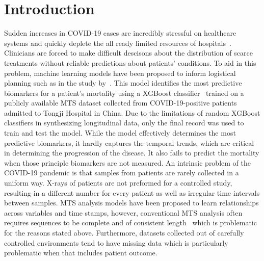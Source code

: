 \section{Introduction}
\iffalse 

1. Which problem we are going to solve?
2. Why solving this problem is important?
3. Which studies have beed tried to solve this problem and what are the disadvantages/difficulties of them?
    3-1. Which properties of longitudinal image datasets should be considered to solve the problem? (e.g. time series, inconsistent number of scans for different participants, some are labeled others are not labeled, ..)
4. So which model we are going to propose to solve the listed problems above?
    4-1. Learn enriched representation of longitudinal images data in a fixed-length vector format which can be readily integrated with the static data.
    4-2. Convolutional layer + LSTM to enrich the images.
    4-3. The proposed model is Semi-supervised learning model.~\cite{tuncel2018autoregressive}
\fi 

Sudden increases in COVID-19 cases are incredibly stressful on healthcare systems and quickly deplete the all ready limited resources of hospitals~\cite{centersstrategies}. Clinicians are forced to make difficult descisons about the distribution of scarce treatments without reliable predictions about patients' conditions. To aid in this problem, machine learning models have been proposed to inform logistical planning such as in the study by~\cite{yan2020interpretable}. This model \cite{yan2020interpretable} identifies the most predictive biomarkers for a patient's mortality using a XGBoost classifier~\cite{chen2016xgboost} trained on a publicly available MTS dataset collected from COVID-19-positive patients admitted to Tongji Hospital in China. Due to the limitations of random XGBoost classifiers in synthesizing longitudinal data, only the final record was used to train and test the model. While the model effectively determines the most predictive biomarkers, it hardly captures the temporal trends, which are critical in determining the progression of the disease. It also fails to predict the mortality when those principle biomarkers are not measured. An intrinsic problem of the COVID-19 pandemic is that samples from patients are rarely collected in a uniform way. X-rays of patients are not preformed for a controlled study, resulting in a different number for every patient as well as irregular time intervals between samples. MTS analysis models have been proposed to learn relationships across variables and time stamps, however, conventional MTS analysis often requires sequences to be complete and of consistent length~\cite{lu2018predicting,wang2017longitudinal,wang2016prediction,wang2012high} which is problematic for the reasons stated above. Furthermore, datasets collected out of carefully controlled environments tend to have missing data which is particularly problematic when that includes patient outcome.

